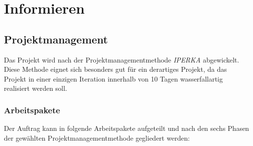 \chapter{Informieren} \label{ch:inform}

\section{Projektmanagement}

Das Projekt wird nach der Projektmanagementmethode \emph{IPERKA} abgewickelt. Diese Methode eignet sich besonders gut
für ein derartiges Projekt, da das Projekt in einer einzigen Iteration innerhalb von 10 Tagen wasserfallartig realisiert werden soll.

\subsection{Arbeitspakete}

Der Auftrag kann in folgende Arbeitspakete aufgeteilt und nach den sechs Phasen der gewählten Projektmanagementmethode gegliedert werden:

